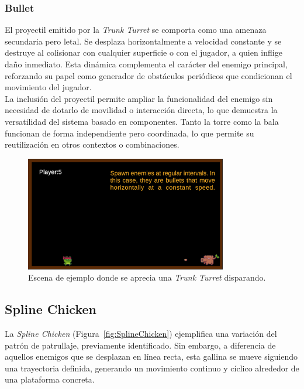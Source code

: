 \subsubsection{Bullet}

El proyectil emitido por la \textit{Trunk Turret} se comporta como una amenaza secundaria pero letal. Se desplaza horizontalmente a velocidad constante y se destruye al colisionar con cualquier superficie o con el jugador, a quien inflige daño inmediato. Esta dinámica complementa el carácter del enemigo principal, reforzando su papel como generador de obstáculos periódicos que condicionan el movimiento del jugador.\\

La inclusión del proyectil permite ampliar la funcionalidad del enemigo sin necesidad de dotarlo de movilidad o interacción directa, lo que demuestra la versatilidad del sistema basado en componentes. Tanto la torre como la bala funcionan de forma independiente pero coordinada, lo que permite su reutilización en otros contextos o combinaciones.\\

\begin{figure}[t]
	\centering
	\includegraphics[height=5cm]{Imagenes/TrunkTorret.png}
	\caption{Escena de ejemplo donde se aprecia una \textit{Trunk Turret} disparando.}
	\label{fig:TrunkTurret}
\end{figure}
\subsection{Spline Chicken}

La \textit{Spline Chicken} (Figura~\ref{fig:SplineChicken}) ejemplifica una variación del patrón de patrullaje, previamente identificado. Sin embargo, a diferencia de aquellos enemigos que se desplazan en línea recta, esta gallina se mueve siguiendo una trayectoria definida, generando un movimiento continuo y cíclico alrededor de una plataforma concreta.\\

